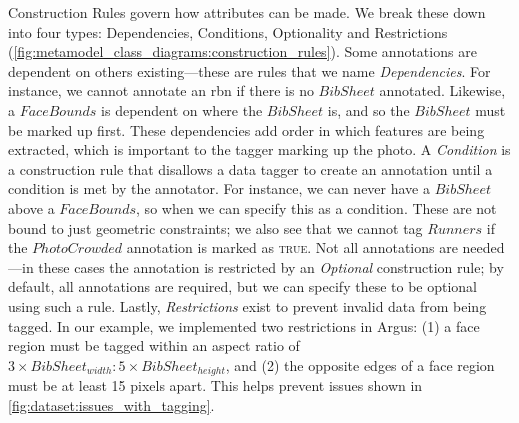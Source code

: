 Construction Rules govern how attributes can be made. We break these down into four types: Dependencies, Conditions, Optionality and Restrictions (\cref{fig:metamodel_class_diagrams:construction_rules}). Some annotations are dependent on others existing---these are rules that we name \textit{Dependencies}. For instance, we cannot annotate an \gls{rbn} if there is no $BibSheet$ annotated. Likewise, a $FaceBounds$ is dependent on where the $BibSheet$ is, and so the $BibSheet$ must be marked up first. These dependencies add order in which features are being extracted, which is important to the tagger marking up the photo. A \textit{Condition} is a construction rule that disallows a data tagger to create an annotation until a condition is met by the annotator. For instance, we can never have a $BibSheet$ above a $FaceBounds$, so when we can specify this as a condition. These are not bound to just geometric constraints; we also see that we cannot tag $Runners$ if the $PhotoCrowded$ annotation is marked as \textsc{true}. Not all annotations are needed---in these cases the annotation is restricted by an \textit{Optional} construction rule; by default, all annotations are required, but we can specify these to be optional using such a rule. Lastly, \textit{Restrictions} exist to prevent invalid data from being tagged. In our example, we implemented two restrictions in Argus: (1) a face region must be tagged within an aspect ratio of $3 \times BibSheet_{width} : 5 \times BibSheet_{height}$, and (2) the opposite edges of a face region must be at least 15 pixels apart. This helps prevent issues shown in \cref{fig:dataset:issues_with_tagging}.

